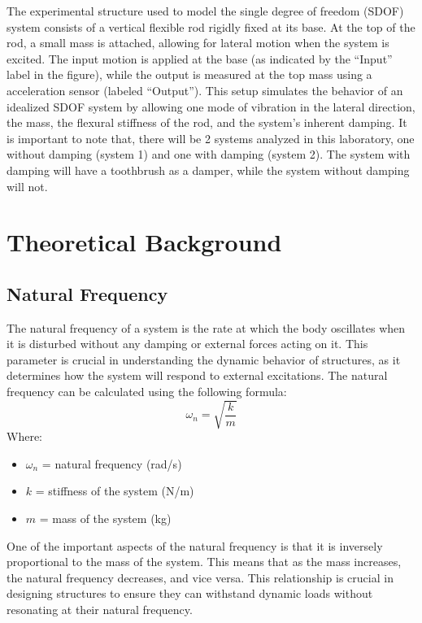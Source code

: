 \documentclass{article}  %
\begin{document}
The experimental structure used to model the single degree of freedom (SDOF) system consists of a vertical flexible rod rigidly fixed at its base. At the top of the rod, a small mass is attached, allowing for lateral motion when the system is excited. The input motion is applied at the base (as indicated by the “Input” label in the figure), while the output is measured at the top mass using a acceleration sensor (labeled “Output”). This setup simulates the behavior of an idealized SDOF system by allowing one mode of vibration in the lateral direction, the mass, the flexural stiffness of the rod, and the system's inherent damping. It is important to note that, there will be 2 systems analyzed in this laboratory, one without damping (system 1) and one with damping (system 2). The system with damping will have a toothbrush as a damper, while the system without damping will not. 




\newpage

\section{Theoretical Background}

\subsection{Natural Frequency}
The natural frequency of a system is the rate at which the body oscillates when it is disturbed without any damping or external forces acting on it. This parameter is crucial in understanding the dynamic behavior of structures, as it determines how the system will respond to external excitations. The natural frequency can be calculated using the following formula:
\begin{equation}
\omega_n = \sqrt{\frac{k}{m}}
\end{equation}
Where:
\begin{itemize}
  \item $\omega_n$ = natural frequency (rad/s)
  \item $k$ = stiffness of the system (N/m)
  \item $m$ = mass of the system (kg)
\end{itemize}

One of the important aspects of the natural frequency is that it is inversely proportional to the mass of the system. This means that as the mass increases, the natural frequency decreases, and vice versa. This relationship is crucial in designing structures to ensure they can withstand dynamic loads without resonating at their natural frequency.
\end{document}
